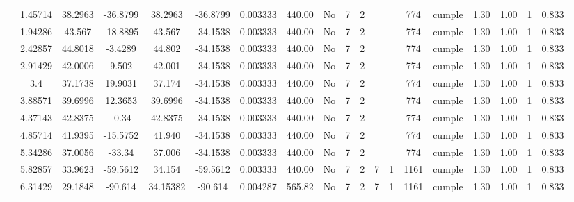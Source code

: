 \begin{table}[H]
{\begin{tabular}{|c|c|c|c|c|c|r|c|c|c|c|c|c|c|c|c|c|c|c|}
\cline{2-19}    & 1.45714 & 38.2963 & -36.8799 & 38.2963 & -36.8799 & 0.003333 & 440.00 & No  & 7   & 2   &     &     & 774 & \cellcolor[rgb]{ .776,  .937,  .808}cumple & 1.30 & 1.00 & 1   & 0.833 \bigstrut\\
\cline{2-19}    & 1.94286 & 43.567 & -18.8895 & 43.567 & -34.1538 & 0.003333 & 440.00 & No  & 7   & 2   &     &     & 774 & \cellcolor[rgb]{ .776,  .937,  .808}cumple & 1.30 & 1.00 & 1   & 0.833 \bigstrut\\
\cline{2-19}    & 2.42857 & 44.8018 & -3.4289 & 44.802 & -34.1538 & 0.003333 & 440.00 & No  & 7   & 2   &     &     & 774 & \cellcolor[rgb]{ .776,  .937,  .808}cumple & 1.30 & 1.00 & 1   & 0.833 \bigstrut\\
\cline{2-19}    & 2.91429 & 42.0006 & 9.502 & 42.001 & -34.1538 & 0.003333 & 440.00 & No  & 7   & 2   &     &     & 774 & \cellcolor[rgb]{ .776,  .937,  .808}cumple & 1.30 & 1.00 & 1   & 0.833 \bigstrut\\
\cline{2-19}    & 3.4 & 37.1738 & 19.9031 & 37.174 & -34.1538 & 0.003333 & 440.00 & No  & 7   & 2   &     &     & 774 & \cellcolor[rgb]{ .776,  .937,  .808}cumple & 1.30 & 1.00 & 1   & 0.833 \bigstrut\\
\cline{2-19}    & 3.88571 & 39.6996 & 12.3653 & 39.6996 & -34.1538 & 0.003333 & 440.00 & No  & 7   & 2   &     &     & 774 & \cellcolor[rgb]{ .776,  .937,  .808}cumple & 1.30 & 1.00 & 1   & 0.833 \bigstrut\\
\cline{2-19}    & 4.37143 & 42.8375 & -0.34 & 42.8375 & -34.1538 & 0.003333 & 440.00 & No  & 7   & 2   &     &     & 774 & \cellcolor[rgb]{ .776,  .937,  .808}cumple & 1.30 & 1.00 & 1   & 0.833 \bigstrut\\
\cline{2-19}    & 4.85714 & 41.9395 & -15.5752 & 41.940 & -34.1538 & 0.003333 & 440.00 & No  & 7   & 2   &     &     & 774 & \cellcolor[rgb]{ .776,  .937,  .808}cumple & 1.30 & 1.00 & 1   & 0.833 \bigstrut\\
\cline{2-19}    & 5.34286 & 37.0056 & -33.34 & 37.006 & -34.1538 & 0.003333 & 440.00 & No  & 7   & 2   &     &     & 774 & \cellcolor[rgb]{ .776,  .937,  .808}cumple & 1.30 & 1.00 & 1   & 0.833 \bigstrut\\
\cline{2-19}    & 5.82857 & 33.9623 & -59.5612 & 34.154 & -59.5612 & 0.003333 & 440.00 & No  & 7   & 2   & 7   & 1   & 1161 & \cellcolor[rgb]{ .776,  .937,  .808}cumple & 1.30 & 1.00 & 1   & 0.833 \bigstrut\\
\cline{2-19}    & 6.31429 & 29.1848 & -90.614 & 34.15382 & -90.614 & 0.004287 & 565.82 & No  & 7   & 2   & 7   & 1   & 1161 & \cellcolor[rgb]{ .776,  .937,  .808}cumple & 1.30 & 1.00 & 1   & 0.833 \bigstrut\\

\end{tabular}}
\end{table}
